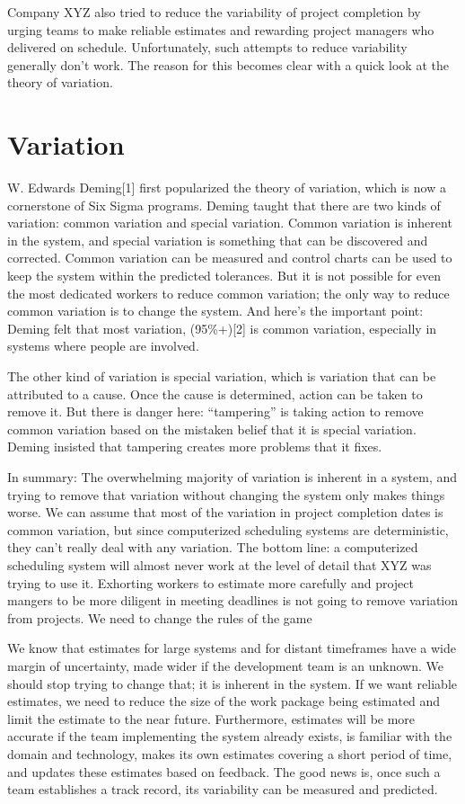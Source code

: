 Company XYZ also tried to reduce the variability of project completion by urging teams to make reliable estimates and rewarding project managers who delivered on schedule. Unfortunately, such attempts to reduce variability generally don’t work. The reason for this becomes clear with a quick look at the theory of variation.

\section*{Variation}

W. Edwards Deming[1] first popularized the theory of variation, which is now a cornerstone of Six Sigma programs. Deming taught that there are two kinds of variation: common variation and special variation. Common variation is inherent in the system, and special variation is something that can be discovered and corrected. Common variation can be measured and control charts can be used to keep the system within the predicted tolerances. But it is not possible for even the most dedicated workers to reduce common variation; the only way to reduce common variation is to change the system. And here’s the important point: Deming felt that most variation, (95\%+)[2] is common variation, especially in systems where people are involved.

The other kind of variation is special variation, which is variation that can be attributed to a cause. Once the cause is determined, action can be taken to remove it. But there is danger here: “tampering” is taking action to remove common variation based on the mistaken belief that it is special variation. Deming insisted that tampering creates more problems that it fixes.

In summary: The overwhelming majority of variation is inherent in a system, and trying to remove that variation without changing the system only makes things worse. We can assume that most of the variation in project completion dates is common variation, but since computerized scheduling systems are deterministic, they can’t really deal with any variation. The bottom line: a computerized scheduling system will almost never work at the level of detail that XYZ was trying to use it. Exhorting workers to estimate more carefully and project mangers to be more diligent in meeting deadlines is not going to remove variation from projects. We need to change the rules of the game


We know that estimates for large systems and for distant timeframes have a wide margin of uncertainty, made wider if the development team is an unknown. We should stop trying to change that; it is inherent in the system. If we want reliable estimates, we need to reduce the size of the work package being estimated and limit the estimate to the near future. Furthermore, estimates will be more accurate if the team implementing the system already exists, is familiar with the domain and technology, makes its own estimates covering a short period of time, and updates these estimates based on feedback. The good news is, once such a team establishes a track record, its variability can be measured and predicted.


